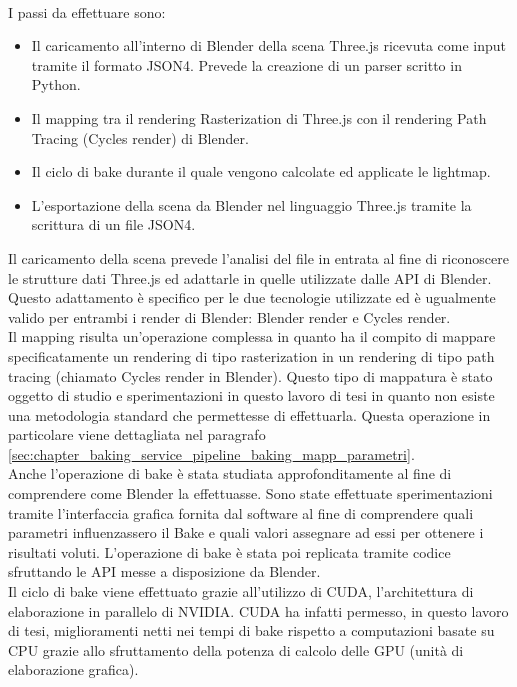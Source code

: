 \\
I passi da effettuare sono:
\begin{itemize}
\item Il caricamento all’interno di Blender della scena Three.js ricevuta come input tramite il formato JSON4. Prevede la creazione di un parser scritto in Python.
\item Il mapping tra il rendering Rasterization di Three.js con il rendering Path Tracing (Cycles render) di Blender.
\item Il ciclo di bake durante il quale vengono calcolate ed applicate le lightmap.
\item L’esportazione della scena da Blender nel linguaggio Three.js tramite la scrittura di un file JSON4.
\end{itemize}

Il caricamento della scena prevede l’analisi del file in entrata al fine di riconoscere le strutture dati Three.js ed adattarle in quelle utilizzate dalle API di Blender.
Questo adattamento è specifico per le due tecnologie utilizzate ed è ugualmente valido per entrambi i render di Blender: Blender render e Cycles render.
\\
Il mapping risulta un’operazione complessa in quanto ha il compito di mappare specificatamente un rendering di tipo rasterization in un rendering di tipo path tracing (chiamato Cycles render in Blender).
Questo tipo di mappatura è stato oggetto di studio e sperimentazioni in questo lavoro di tesi in quanto non esiste una metodologia standard che permettesse di effettuarla. Questa operazione in particolare viene dettagliata nel paragrafo \ref{sec:chapter_baking_service_pipeline_baking_mapp_parametri}.
\\
Anche l’operazione di bake è stata studiata approfonditamente al fine di comprendere come Blender la effettuasse. Sono state effettuate sperimentazioni tramite l’interfaccia grafica fornita dal software al fine di comprendere quali parametri influenzassero il Bake e quali valori assegnare ad essi per ottenere i risultati voluti. L’operazione di bake è stata poi replicata tramite codice sfruttando le API messe a disposizione da Blender.
\\
Il ciclo di bake viene effettuato grazie all’utilizzo di CUDA, l'architettura di elaborazione in parallelo di NVIDIA. 
CUDA ha infatti permesso, in questo lavoro di tesi, miglioramenti netti nei tempi di bake rispetto a computazioni basate su CPU grazie allo sfruttamento della potenza di calcolo delle GPU (unità di elaborazione grafica).
\\
